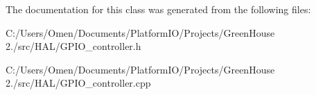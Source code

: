 The documentation for this class was generated from the following files\+:\begin{DoxyCompactItemize}
\item 
C\+:/\+Users/\+Omen/\+Documents/\+Platform\+I\+O/\+Projects/\+Green\+House 2./src/\+H\+A\+L/G\+P\+I\+O\+\_\+controller.\+h\item 
C\+:/\+Users/\+Omen/\+Documents/\+Platform\+I\+O/\+Projects/\+Green\+House 2./src/\+H\+A\+L/G\+P\+I\+O\+\_\+controller.\+cpp\end{DoxyCompactItemize}
